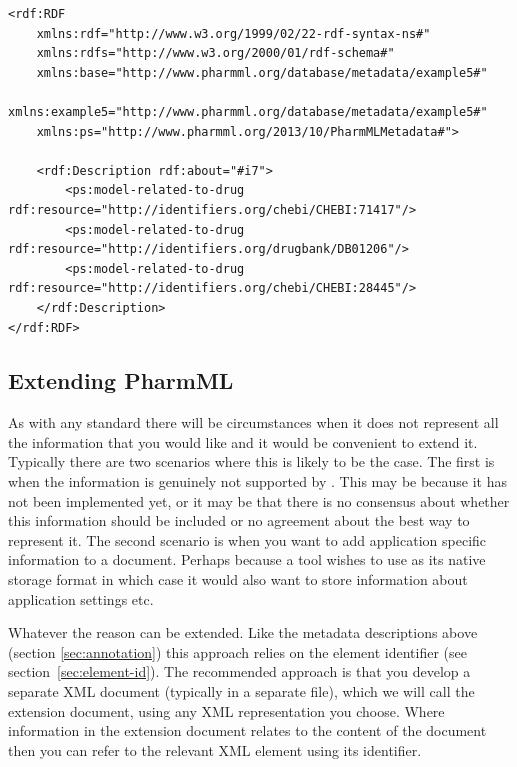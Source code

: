 %
\lstset{language=XML}
\begin{lstlisting}
<rdf:RDF
    xmlns:rdf="http://www.w3.org/1999/02/22-rdf-syntax-ns#"
    xmlns:rdfs="http://www.w3.org/2000/01/rdf-schema#"
    xmlns:base="http://www.pharmml.org/database/metadata/example5#"
    xmlns:example5="http://www.pharmml.org/database/metadata/example5#"
    xmlns:ps="http://www.pharmml.org/2013/10/PharmMLMetadata#"> 
    
    <rdf:Description rdf:about="#i7">
        <ps:model-related-to-drug rdf:resource="http://identifiers.org/chebi/CHEBI:71417"/>
        <ps:model-related-to-drug rdf:resource="http://identifiers.org/drugbank/DB01206"/>
        <ps:model-related-to-drug rdf:resource="http://identifiers.org/chebi/CHEBI:28445"/>
    </rdf:Description>
</rdf:RDF>
\end{lstlisting}

\subsection{Extending PharmML}
\label{sec:extension}

As with any standard there will be circumstances when it does not
represent all the information that you would like and it would be
convenient to extend it. Typically there are two scenarios where this
is likely to be the case. The first is when the information is genuinely
not supported by \pharmml. This may be because it has not been
implemented yet, or it may be that there is no consensus about whether
this information should be included or no agreement about the best way
to represent it. The second scenario is when you want to
add application specific information to a \pharmml document. Perhaps
because a tool wishes to use \pharmml as its native storage format in
which case it would also want to store information about application
settings etc.

Whatever the reason \pharmml can be extended. Like the metadata
descriptions above (section \ref{sec:annotation}) this approach relies
on the element identifier (see section~\ref{sec:element-id}). The
recommended approach is that you develop a separate XML document
(typically in a separate file), which we will call the extension
document, using any XML representation you choose. Where information
in the extension document relates to the content of the \pharmml
document then you can refer to the relevant XML element using its
identifier.

